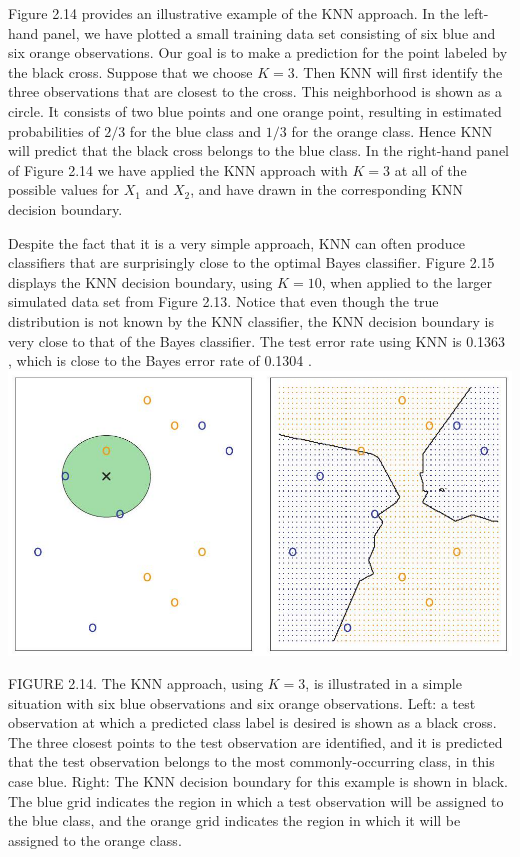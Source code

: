 \documentclass[10pt]{article}
\begin{document}
Figure 2.14 provides an illustrative example of the KNN approach. In the left-hand panel, we have plotted a small training data set consisting of six blue and six orange observations. Our goal is to make a prediction for the point labeled by the black cross. Suppose that we choose $K=3$. Then KNN will first identify the three observations that are closest to the cross. This neighborhood is shown as a circle. It consists of two blue points and one orange point, resulting in estimated probabilities of $2 / 3$ for the blue class and $1 / 3$ for the orange class. Hence KNN will predict that the black cross belongs to the blue class. In the right-hand panel of Figure 2.14 we have applied the KNN approach with $K=3$ at all of the possible values for $X_{1}$ and $X_{2}$, and have drawn in the corresponding KNN decision boundary.

Despite the fact that it is a very simple approach, KNN can often produce classifiers that are surprisingly close to the optimal Bayes classifier. Figure 2.15 displays the KNN decision boundary, using $K=10$, when applied to the larger simulated data set from Figure 2.13. Notice that even though the true distribution is not known by the KNN classifier, the KNN decision boundary is very close to that of the Bayes classifier. The test error rate using KNN is 0.1363 , which is close to the Bayes error rate of 0.1304 .\\
\includegraphics[max width=\textwidth, center]{2025_05_05_efe77898333945044de4g-055}

FIGURE 2.14. The KNN approach, using $K=3$, is illustrated in a simple situation with six blue observations and six orange observations. Left: a test observation at which a predicted class label is desired is shown as a black cross. The three closest points to the test observation are identified, and it is predicted that the test observation belongs to the most commonly-occurring class, in this case blue. Right: The KNN decision boundary for this example is shown in black. The blue grid indicates the region in which a test observation will be assigned to the blue class, and the orange grid indicates the region in which it will be assigned to the orange class.
\end{document}
